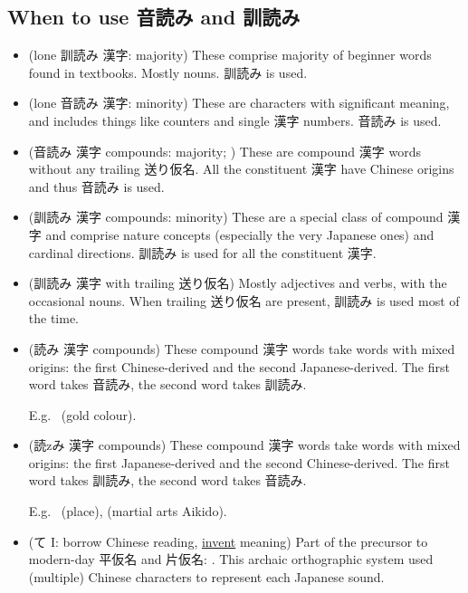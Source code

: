 \documentclass[../nihongo-gakushuu-kyouzai.tex]{subfiles}
\begin{document}
\subsection{When to use 音読み and 訓読み}

\begin{itemize}
    \item (lone 訓読み 漢字: majority) These comprise majority of beginner words found in textbooks. Mostly nouns. 訓読み is used.

    \item (lone 音読み 漢字: minority) These are characters with significant meaning, and includes things like counters and single 漢字 numbers. 音読み is used.

    \item (音読み 漢字 compounds: majority; ) These are compound 漢字 words without any trailing 送り仮名. All the constituent 漢字 have Chinese origins and thus 音読み is used.

    \item (訓読み 漢字 compounds: minority) These are a special class of compound 漢字 and comprise nature concepts (especially the very Japanese ones) and cardinal directions. 訓読み is used for all the constituent 漢字.

    \item (訓読み 漢字 with trailing 送り仮名) Mostly adjectives and verbs, with the occasional nouns. When trailing 送り仮名 are present, 訓読み is used most of the time.

    \item (読み 漢字 compounds) These compound 漢字 words take words with mixed origins: the first Chinese-derived and the second Japanese-derived. The first word takes 音読み, the second word takes 訓読み.

    E.g.\  (gold colour).

    \item (読zみ 漢字 compounds) These compound 漢字 words take words with mixed origins: the first Japanese-derived and the second Chinese-derived. The first word takes 訓読み, the second word takes 音読み.

    E.g.\  (place),  (martial arts Aikido).

    \item (て I: borrow Chinese reading, \ul{invent} meaning) Part of the precursor to modern-day 平仮名 and 片仮名: . This archaic orthographic system used (multiple) Chinese characters to represent each Japanese sound.


\end{itemize}
\end{document}
